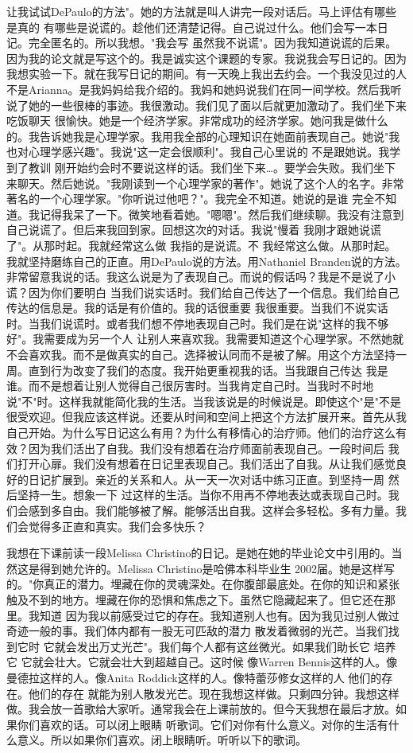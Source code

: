 让我试试DePaulo的方法"。她的方法就是叫人讲完一段对话后。马上评估有哪些是真的 有哪些是说谎的。趁他们还清楚记得。自己说过什么。他们会写一本日记。完全匿名的。所以我想。"我会写 虽然我不说谎"。因为我知道说谎的后果。因为我的论文就是写这个的。我是诚实这个课题的专家。我说我会写日记的。因为我想实验一下。就在我写日记的期间。有一天晚上我出去约会。一个我没见过的人 不是Arianna。是我妈妈给我介绍的。我妈和她妈说我们在同一间学校。然后我听说了她的一些很棒的事迹。我很激动。我们见了面以后就更加激动了。我们坐下来 吃饭聊天 很愉快。她是一个经济学家。非常成功的经济学家。她问我是做什么的。我告诉她我是心理学家。我用我全部的心理知识在她面前表现自己。她说"我也对心理学感兴趣"。我说"这一定会很顺利"。我自己心里说的 不是跟她说。我学到了教训 刚开始约会时不要说这样的话。我们坐下来…。要学会失败。我们坐下来聊天。然后她说。"我刚读到一个心理学家的著作"。她说了这个人的名字。非常著名的一个心理学家。"你听说过他吧？"。我完全不知道。她说的是谁 完全不知道。我记得我呆了一下。微笑地看着她。"嗯嗯"。然后我们继续聊。我没有注意到自己说谎了。但后来我回到家。回想这次的对话。我说"慢着 我刚才跟她说谎了"。从那时起。我就经常这么做 我指的是说谎。不 我经常这么做。从那时起。我就坚持磨练自己的正直。用DePaulo说的方法。用Nathaniel Branden说的方法。非常留意我说的话。我这么说是为了表现自己。而说的假话吗？我是不是说了小谎？因为你们要明白 当我们说实话时。我们给自己传达了一个信息。我们给自己传达的信息是。我的话是有价值的。我的话很重要 我很重要。当我们不说实话时。当我们说谎时。或者我们想不停地表现自己时。我们是在说"这样的我不够好"。我需要成为另一个人 让别人来喜欢我。我需要知道这个心理学家。不然她就不会喜欢我。而不是做真实的自己。选择被认同而不是被了解。用这个方法坚持一周。直到行为改变了我们的态度。我开始更重视我的话。当我跟自己传达 我是谁。而不是想着让别人觉得自己很厉害时。当我肯定自己时。当我时不时地说"不"时。这样我就能简化我的生活。当我该说是的时候说是。即使这个"是"不是很受欢迎。但我应该这样说。还要从时间和空间上把这个方法扩展开来。首先从我自己开始。为什么写日记这么有用？为什么有移情心的治疗师。他们的治疗这么有效？因为我们活出了自我。我们没有想着在治疗师面前表现自己。一段时间后 我们打开心扉。我们没有想着在日记里表现自己。我们活出了自我。从让我们感觉良好的日记扩展到。亲近的关系和人。从一天一次对话中练习正直。到坚持一周 然后坚持一生。想象一下 过这样的生活。当你不用再不停地表达或表现自己时。我们会感到多自由。我们能够被了解。能够活出自我。这样会多轻松。多有力量。我们会觉得多正直和真实。我们会多快乐？ 

我想在下课前读一段Melissa Christino的日记。是她在她的毕业论文中引用的。当然这是得到她允许的。Melissa Christino是哈佛本科毕业生 2002届。她是这样写的。"你真正的潜力。埋藏在你的灵魂深处。在你腹部最底处。在你的知识和紧张触及不到的地方。埋藏在你的恐惧和焦虑之下。虽然它隐藏起来了。但它还在那里。我知道 因为我以前感受过它的存在。我知道别人也有。因为我见过别人做过奇迹一般的事。我们体内都有一股无可匹敌的潜力 散发着微弱的光芒。当我们找到它时 它就会发出万丈光芒"。我们每个人都有这丝微光。如果我们助长它 培养它 它就会壮大。它就会壮大到超越自己。这时候 像Warren Bennis这样的人。像曼德拉这样的人。像Anita Roddick这样的人。像特蕾莎修女这样的人 他们的存在。他们的存在 就能为别人散发光芒。现在我想这样做。只剩四分钟。我想这样做。我会放一首歌给大家听。通常我会在上课前放的。但今天我想在最后才放。如果你们喜欢的话。可以闭上眼睛 听歌词。它们对你有什么意义。对你的生活有什么意义。所以如果你们喜欢。闭上眼睛听。听听以下的歌词。 

